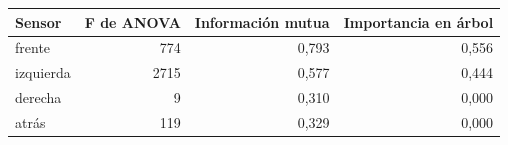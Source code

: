 \begin{tabular}{lrrr}
\toprule
Sensor & F de ANOVA & Información mutua & Importancia en árbol \\
\midrule
frente & 774 & 0,793 & 0,556 \\
izquierda & 2715 & 0,577 & 0,444 \\
derecha & 9 & 0,310 & 0,000 \\
atrás & 119 & 0,329 & 0,000 \\
\bottomrule
\end{tabular}
